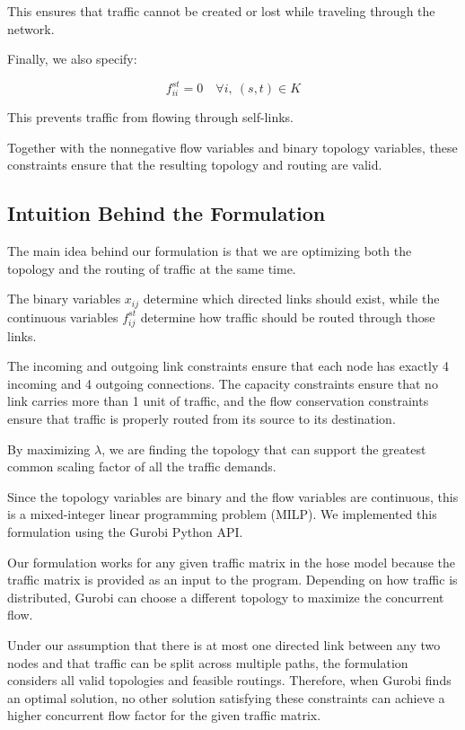 \documentclass[11pt]{article}
\theoremstyle{definition}
\begin{document}
This ensures that traffic cannot be created or lost while traveling through the network.

Finally, we also specify:

\[
f_{ii}^{st} = 0
\quad \forall i,\ (s,t)\in K
\]

This prevents traffic from flowing through self-links.

Together with the nonnegative flow variables and binary topology variables, these constraints ensure that the resulting topology and routing are valid.

\subsection{Intuition Behind the Formulation}

The main idea behind our formulation is that we are optimizing both the topology and the routing of traffic at the same time.

The binary variables $x_{ij}$ determine which directed links should exist, while the continuous variables $f_{ij}^{st}$ determine how traffic should be routed through those links.

The incoming and outgoing link constraints ensure that each node has exactly 4 incoming and 4 outgoing connections. The capacity constraints ensure that no link carries more than 1 unit of traffic, and the flow conservation constraints ensure that traffic is properly routed from its source to its destination.

By maximizing $\lambda$, we are finding the topology that can support the greatest common scaling factor of all the traffic demands.

Since the topology variables are binary and the flow variables are continuous, this is a mixed-integer linear programming problem (MILP). We implemented this formulation using the Gurobi Python API.

Our formulation works for any given traffic matrix in the hose model because the traffic matrix is provided as an input to the program. Depending on how traffic is distributed, Gurobi can choose a different topology to maximize the concurrent flow.

Under our assumption that there is at most one directed link between any two nodes and that traffic can be split across multiple paths, the formulation considers all valid topologies and feasible routings. Therefore, when Gurobi finds an optimal solution, no other solution satisfying these constraints can achieve a higher concurrent flow factor for the given traffic matrix.
\end{document}

